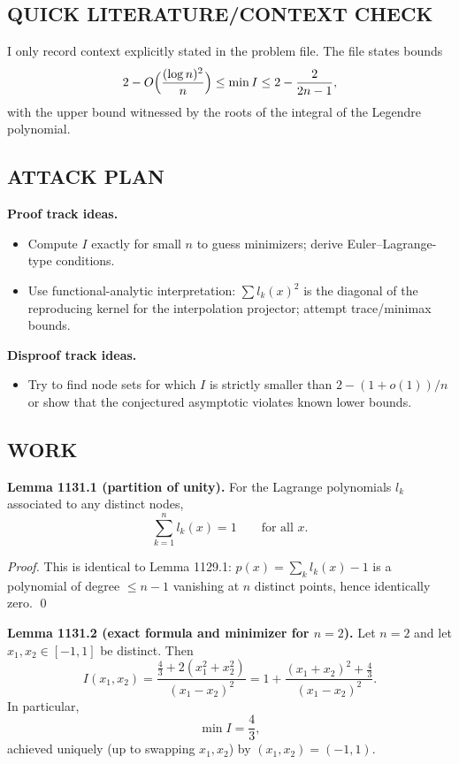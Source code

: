 \subsection*{QUICK LITERATURE/CONTEXT CHECK}
I only record context explicitly stated in the problem file.
The file states bounds
\[
2-O\Bigl(\frac{(\log n)^2}{n}\Bigr)\le \min I\le 2-\frac{2}{2n-1},
\]
with the upper bound witnessed by the roots of the integral of the Legendre polynomial.

\subsection*{ATTACK PLAN}
\textbf{Proof track ideas.}
\begin{itemize}
\item Compute $I$ exactly for small $n$ to guess minimizers; derive Euler--Lagrange-type conditions.
\item Use functional-analytic interpretation: $\sum l_k(x)^2$ is the diagonal of the reproducing kernel for the interpolation projector; attempt trace/minimax bounds.
\end{itemize}
\textbf{Disproof track ideas.}
\begin{itemize}
\item Try to find node sets for which $I$ is strictly smaller than $2-(1+o(1))/n$ or show that the conjectured asymptotic violates known lower bounds.
\end{itemize}

\subsection*{WORK}
\textbf{Lemma 1131.1 (partition of unity).}
For the Lagrange polynomials $l_k$ associated to any distinct nodes,
\[
\sum_{k=1}^n l_k(x)=1\qquad\text{for all }x.
\]

\emph{Proof.}
This is identical to Lemma 1129.1: $p(x)=\sum_k l_k(x)-1$ is a polynomial of degree $\le n-1$ vanishing at $n$ distinct points, hence identically zero. \qed

\textbf{Lemma 1131.2 (exact formula and minimizer for $n=2$).}
Let $n=2$ and let $x_1,x_2\in[-1,1]$ be distinct.
Then
\[
I(x_1,x_2)=\frac{\frac{4}{3}+2(x_1^2+x_2^2)}{(x_1-x_2)^2}
=1+\frac{(x_1+x_2)^2+\frac{4}{3}}{(x_1-x_2)^2}.
\]
In particular,
\[
\min I = \frac{4}{3},
\]
achieved uniquely (up to swapping $x_1,x_2$) by $(x_1,x_2)=(-1,1)$.

